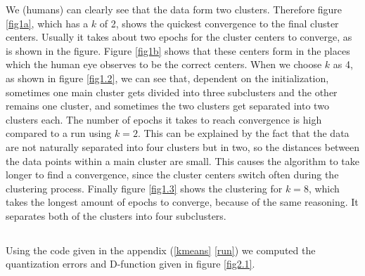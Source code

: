 \documentclass[10pt]{article}
\begin{document}
\noindent We (humans) can clearly see that the data form two clusters. Therefore figure \ref{fig1a}, which has a $k$ of 2, shows the quickest convergence to the final cluster centers. Usually it takes about two epochs for the cluster centers to converge, as is shown in the figure. Figure \ref{fig1b} shows that these centers form in the places which the human eye observes to be the correct centers. When we choose $k$ as 4, as shown in figure \ref{fig1.2}, we can see that, dependent on the initialization, sometimes one main cluster gets divided into three subclusters and the other remains one cluster, and sometimes the two clusters get separated into two clusters each. The number of epochs it takes to reach convergence is high compared to a run using $k=2$. This can be explained by the fact that the data are not naturally separated into four clusters but in two, so the distances between the data points within a main cluster are small. This causes the algorithm to take longer to find a convergence, since the cluster centers switch often during the clustering process. Finally figure \ref{fig1.3} shows the clustering for $k = 8$, which takes the longest amount of epochs to converge, because of the same reasoning. It separates both of the clusters into four subclusters. 

\subsection{}
Using the code given in the appendix (\ref{kmeans} \ref{run}) we computed the quantization errors and D-function given in figure \ref{fig2.1}.
\end{document}
